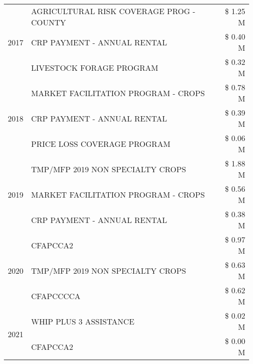 \begin{tabular}{llr}
\cline{1-3}
\multirow[t]{3}{*}{2017} & AGRICULTURAL RISK COVERAGE PROG - COUNTY & \$ 1.25 M \\
 & CRP PAYMENT - ANNUAL RENTAL & \$ 0.40 M \\
 & LIVESTOCK FORAGE PROGRAM & \$ 0.32 M \\
\cline{1-3}
\multirow[t]{3}{*}{2018} & MARKET FACILITATION PROGRAM - CROPS & \$ 0.78 M \\
 & CRP PAYMENT - ANNUAL RENTAL & \$ 0.39 M \\
 & PRICE LOSS COVERAGE PROGRAM & \$ 0.06 M \\
\cline{1-3}
\multirow[t]{3}{*}{2019} & TMP/MFP 2019 NON SPECIALTY CROPS & \$ 1.88 M \\
 & MARKET FACILITATION PROGRAM - CROPS & \$ 0.56 M \\
 & CRP PAYMENT - ANNUAL RENTAL & \$ 0.38 M \\
\cline{1-3}
\multirow[t]{3}{*}{2020} & CFAPCCA2 & \$ 0.97 M \\
 & TMP/MFP 2019 NON SPECIALTY CROPS & \$ 0.63 M \\
 & CFAPCCCCA & \$ 0.62 M \\
\cline{1-3}
\multirow[t]{2}{*}{2021} & WHIP PLUS 3 ASSISTANCE & \$ 0.02 M \\
 & CFAPCCA2 & \$ 0.00 M \\
\cline{1-3}
\bottomrule
\end{tabular}
